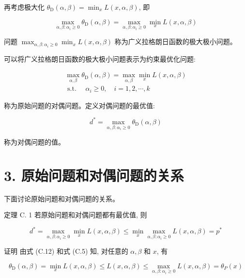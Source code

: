 \documentclass[10pt]{article}
\begin{document}
再考虑极大化 $\theta_{\mathrm{D}}(\alpha, \beta)=\min _{x} L(x, \alpha, \beta)$, 即


\begin{equation*}
\max _{\alpha, \beta: \alpha_{i} \geqslant 0} \theta_{\mathrm{D}}(\alpha, \beta)=\max _{\alpha, \beta: \alpha_{i} \geqslant 0} \min _{x} L(x, \alpha, \beta) \tag{C.11}
\end{equation*}


问题 $\max _{\alpha, \beta: \alpha_{i} \geqslant 0} \min _{x} L(x, \alpha, \beta)$ 称为广义拉格朗日函数的极大极小问题。

可以将广义拉格朗日函数的极大极小问题表示为约束最优化问题:


\begin{gather*}
\max _{\alpha, \beta} \theta_{\mathrm{D}}(\alpha, \beta)=\max _{\alpha, \beta} \min _{x} L(x, \alpha, \beta)  \tag{C.12}\\
\text { s.t. } \quad \alpha_{i} \geqslant 0, \quad i=1,2, \cdots, k \tag{C.13}
\end{gather*}


称为原始问题的对偶问题。定义对偶问题的最优值:


\begin{equation*}
d^{*}=\max _{\alpha, \beta: \alpha_{i} \geqslant 0} \theta_{\mathrm{D}}(\alpha, \beta) \tag{C.14}
\end{equation*}


称为对偶问题的值。

\section*{3. 原始问题和对偶问题的关系}
下面讨论原始问题和对偶问题的关系。

定理 C. 1 若原始问题和对偶问题都有最优值, 则


\begin{equation*}
d^{*}=\max _{\alpha, \beta: \alpha_{i} \geqslant 0} \min _{x} L(x, \alpha, \beta) \leqslant \min _{x} \max _{\alpha, \beta: \alpha_{i} \geqslant 0} L(x, \alpha, \beta)=p^{*} \tag{C.15}
\end{equation*}


证明 由式 (C.12) 和式 (C.5) 知, 对任意的 $\alpha, \beta$ 和 $x$, 有


\begin{equation*}
\theta_{\mathrm{D}}(\alpha, \beta)=\min _{x} L(x, \alpha, \beta) \leqslant L(x, \alpha, \beta) \leqslant \max _{\alpha, \beta: \alpha_{i} \geqslant 0} L(x, \alpha, \beta)=\theta_{P}(x) \tag{C.16}
\end{equation*}
\end{document}
